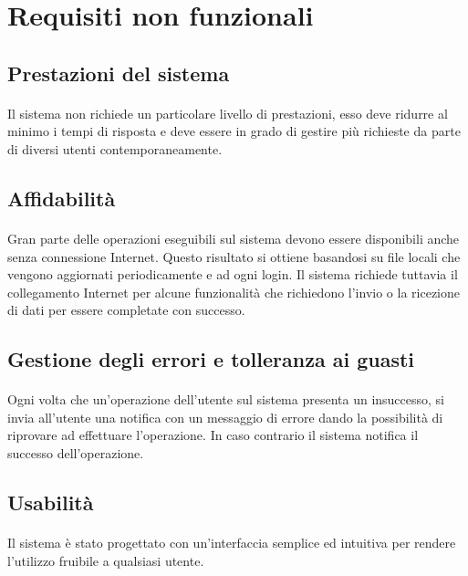 \section{Requisiti non funzionali}

\subsection{Prestazioni del sistema }
\paragraph{} 
Il sistema non richiede un particolare livello di prestazioni, esso deve ridurre al minimo i tempi di risposta e deve essere in grado di gestire più richieste da parte di diversi utenti contemporaneamente. 

\subsection{Affidabilità }
\paragraph{}
Gran parte delle operazioni eseguibili sul sistema devono essere disponibili anche senza connessione Internet. Questo risultato si ottiene basandosi su file locali che vengono aggiornati periodicamente e ad ogni login. Il sistema richiede tuttavia il collegamento Internet per alcune funzionalità che richiedono l’invio o la ricezione di dati per essere completate con successo. 

\subsection{Gestione degli errori e tolleranza ai guasti }
\paragraph{}
Ogni volta che un’operazione dell’utente sul sistema presenta un insuccesso, si invia all’utente una notifica con un messaggio di errore dando la possibilità di riprovare ad effettuare l’operazione. In caso contrario il sistema notifica il successo dell’operazione. 

\subsection{Usabilità}
\paragraph{} 
Il sistema è stato progettato con un’interfaccia semplice ed intuitiva per rendere l’utilizzo fruibile a qualsiasi utente. 

